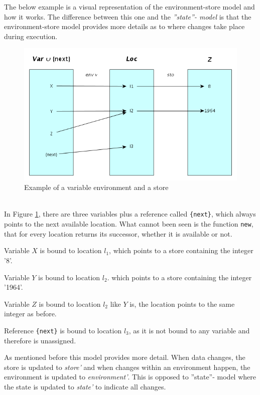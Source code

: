 The below example is a visual representation of the environment-store model and how it works. The difference between this one and the \emph{''state''- model} is that the environment-store model provides more details as to where changes take place during execution.
\begin{figure}[!h]
\centering
	\includegraphics[scale=0.55]{img/envstore.png}
	\caption{Example of a variable environment and a store \cite{transtrees}}
	\label{img:env}
\end{figure}\\
In Figure \ref{img:env}, there are three variables plus a reference called \texttt{\{next\}}, which always points to the next available location. What cannot been seen is the function \texttt{new}, that for every location returns its successor, whether it is available or not.
\begin{description}
\item Variable $X$ is bound to location $l_1$, which points to a store containing the integer '8'.
\item Variable $Y$ is bound to location $l_2$. which points to a store containing the integer '1964'.
\item Variable $Z$ is bound to location $l_2$ like $Y$ is, the location points to the same integer as before.
\item Reference \texttt{\{next\}} is bound to location $l_3$, as it is not bound to any variable and therefore is unassigned.
\end{description}
As mentioned before this model provides more detail. When data changes, the store is updated to \emph{store'} and when changes within an environment happen, the environment is updated to \emph{environment'}. This is opposed to ''state''- model where the state is updated to \emph{state'} to indicate all changes.